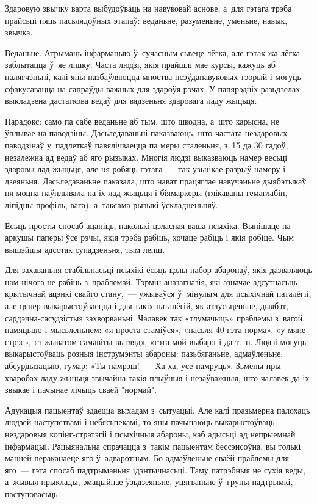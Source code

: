 Здаровую звычку варта выбудоўваць на навуковай аснове, а~для гэтага трэба прайсьці пяць пасьлядоўных этапаў: веданьне, разуменьне, уменьне, навык, звычка.

Веданьне. Атрымаць інфармацыю ў~сучасным сьвеце лёгка, але гэтак жа лёгка заблытацца ў~яе лішку. Часта людзі, якія прайшлі мае курсы, кажуць аб палягчэньні, калі яны пазбаўляюцца мноства псэўданавуковых тэорый і могуць сфакусавацца на сапраўды важных для здароўя рэчах. У папярэдніх разьдзелах выкладзена дастаткова ведаў для вядзеньня здаровага ладу жыцьця.

Парадокс: само па сабе веданьне аб тым, што шкодна, а~што карысна, не ўплывае на паводзіны. Дасьледаваньні паказваюць, што частата нездаровых паводзінаў у~падлеткаў павялічваецца па меры сталеньня, з~15 да 30 гадоў, незалежна ад ведаў аб яго рызыках. Многія людзі выказваюць намер весьці здаровы лад жыцьця, але ня робяць гэтага~--- так узьнікае разрыў намеру і дзеяньня. Дасьледаваньне паказала, што нават працяглае навучаньне дыябэтыкаў ня моцна паўплывала на іх лад жыцьця і біямаркеры (глікаваны гемаглабін, ліпідны профіль, вага), а~таксама рызыкі ўскладненьняў.

Ёсьць просты спосаб ацаніць, наколькі цэласная ваша псыхіка. Выпішаце на аркушы паперы ўсе рэчы, якія трэба рабіць, хочаце рабіць і якія робіце. Чым вышэйшы адсотак супадзеньня, тым лепш.

Для захаваньня стабільнасьці псыхікі ёсьць цэлы набор абаронаў, якія дазваляюць нам нічога не рабіць з~праблемай. Тэрмін аназагназія, які азначае адсутнасьць крытычнай ацэнкі свайго стану,~--- ужываўся ў~мінулым для псыхічнай паталёгіі, але цяпер выкарыстоўваецца і для такіх паталёгій, як атлусьценьне, дыябэт, сардэчна-сасудзістыя захворваньні. Чалавек так «тлумачыць» праблемы з~вагой, памяцьцю і мысьленьнем: «я проста стаміўся», «пасьля 40 гэта норма», «у мяне стрэс», «з жыватом самавіты выгляд», «гэта мой выбар» і да т.~п. Людзі могуць выкарыстоўваць розныя інструмэнты абароны: пазьбяганьне, адмаўленьне, абсурдызацыю, гумар: «Ты памрэш!~--- Ха-ха, усе памруць». Зьмены пры хваробах ладу жыцьця звычайна такія плыўныя і незаўважныя, што чалавек да іх звыкае і пачынае лічыць сваёй "нормай". 

Адукацыя пацыентаў здаецца выхадам з~сытуацыі. Але калі празьмерна палохаць людзей наступствамі і небясьпекамі, то яны пачынаюць выкарыстоўваць нездаровыя копінг-стратэгіі і псыхічныя абароны, каб адысьці ад непрыемнай інфармацыі. Рацыянальна спрачацца з~такім пацыентам бессэнсоўна, вы толькі мацней пераканаеце яго ў~адваротным. Бо адмаўленьне сваёй праблемы для яго~--- гэта спосаб падтрыманьня ідэнтычнасьці. Таму патрэбныя не сухія веды, а~жывыя прыклады, эмацыйнае ўзьдзеяньне, уцягваньне ў~групы падтрымкі, паступовасьць.

